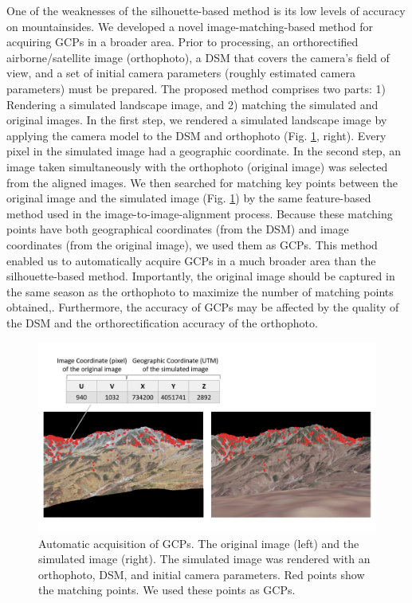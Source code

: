 \documentclass{article}
\begin{document}
One of the weaknesses of the silhouette-based method is its low levels of accuracy on mountainsides. We developed a novel image-matching-based method for acquiring GCPs in a broader area. Prior to processing, an orthorectified airborne/satellite image (orthophoto), a DSM that covers the camera's field of view, and a set of initial camera parameters (roughly estimated camera parameters) must be prepared. The proposed method comprises two parts: 1) Rendering a simulated landscape image, and 2) matching the simulated and original images. In the first step, we rendered a simulated landscape image by applying the camera model to the DSM and orthophoto (Fig. \ref{fig:matched}, right). Every pixel in the simulated image had a geographic coordinate. In the second step, an image taken simultaneously with the orthophoto (original image) was selected from the aligned images. We then searched for matching key points between the original image and the simulated image (Fig. \ref{fig:matched}) by the same feature-based method used in the image-to-image-alignment process. Because these matching points have both geographical coordinates (from the DSM) and image coordinates (from the original image), we used them as GCPs. This method enabled us to automatically acquire GCPs in a much broader area than the silhouette-based method. Importantly, the original image should be captured in the same season as the orthophoto to maximize the number of matching points obtained,. Furthermore, the accuracy of GCPs may be affected by the quality of the DSM and the orthorectification accuracy of the orthophoto.

\begin{figure}
\includegraphics[width=1\linewidth]{paper_files/figures/Slide4} \caption{Automatic acquisition of GCPs. The original image (left) and the simulated image (right). The simulated image was rendered with an orthophoto, DSM, and initial camera parameters. Red points show the matching points. We used these points as GCPs.}\label{fig:matched}
\end{figure}
\end{document}
